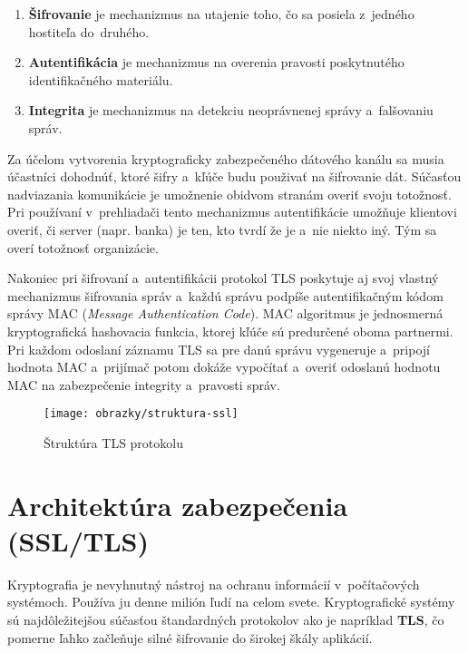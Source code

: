\begin{enumerate}

\item \textbf{Šifrovanie} je mechanizmus na utajenie toho, čo sa posiela z~jedného hostiteľa do~druhého.

\item \textbf{Autentifikácia} je mechanizmus na overenia pravosti poskytnutého identifikačného materiálu.

\item \textbf{Integrita} je mechanizmus na detekciu neoprávnenej správy a~falšovaniu správ.

\end{enumerate}

Za účelom vytvorenia kryptograficky zabezpečeného dátového kanálu sa musia účastníci  dohodnúť, ktoré šifry a~kľúče budu použivať na šifrovanie dát. Súčasťou nadviazania komunikácie je umožnenie obidvom stranám overiť svoju totožnosť. Pri používaní v~pre\-hlia\-da\-či tento mechanizmus autentifikácie umožňuje klientovi overiť, či server (napr. banka) je ten, kto tvrdí že je a~nie niekto iný. Tým sa overí totožnosť organizácie.

Nakoniec pri šifrovaní a~autentifikácii protokol TLS poskytuje aj svoj vlastný mechanizmus šifrovania správ a~každú správu podpíše autentifikačným kódom správy MAC (\emph{Message Authentication Code}). MAC algoritmus je jednosmerná kryptografická hashovacia funkcia, ktorej kľúče sú predurčené oboma partnermi. Pri každom odoslaní záznamu TLS sa pre danú správu vygeneruje a~pripojí hodnota MAC a~prijímač potom dokáže vypočítať a~overiť odoslanú hodnotu MAC na zabezpečenie integrity a~pravosti správ. \cite{tls-protokol}

\begin{figure}[!h]
    \centering
    \vspace{1cm}
    \texttt{[image: obrazky/struktura-ssl]}
    \caption{Štruktúra TLS protokolu}
    \label{struktura-ssl}
\end{figure}

\section{Architektúra zabezpečenia (SSL/TLS)}
Kryptografia je nevyhnutný nástroj na ochranu informácií v~počítačových systémoch. Po\-u\-ží\-va ju denne milión ľudí na celom svete. Kryptografické systémy sú najdôležitejšou súčasťou štandardných protokolov ako je napríklad \textbf{TLS}, čo pomerne ľahko začleňuje silné šifrovanie do širokej škály aplikácií.

